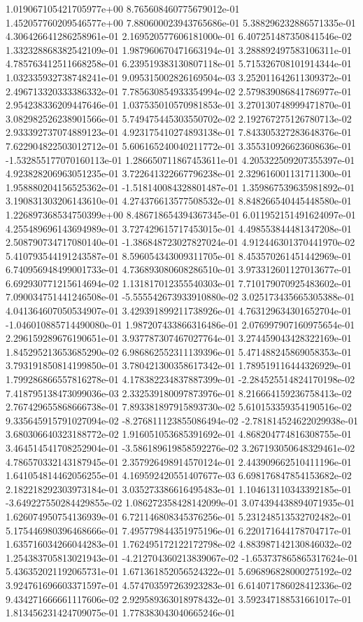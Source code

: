 1.019067105421705977e+00	8.765608460775679012e-01	1.452057760209546577e+00	7.880600023943765686e-01	5.388296232886571335e-01	4.306426641286258961e-01	2.169520577606181000e-01	6.407251487350841546e-02	1.332328868382542109e-01	1.987960670471663194e-01	3.288892497583106311e-01	4.785763412511668258e-01	6.239519383130807118e-01	5.715326708101914344e-01	1.032335932738748241e-01	9.095315002826169504e-03	3.252011642611309372e-01	2.496713320333386332e-01	7.785630854933354994e-02	2.579839086841786977e-01	2.954238336209447646e-01	1.037535010570981853e-01	3.270130748999471870e-01	3.082982526238901566e-01	5.749475445303550702e-02	2.192767275126780713e-02	2.933392737074889123e-01	4.923175410274893138e-01	7.843305327283648376e-01	7.622904822503012712e-01	5.606165240040211772e-01	3.355310926623608636e-01	-1.532855177070160113e-01	1.286650711867453611e-01	4.205322509207355397e-01	4.923828206963051235e-01	3.722641322667796238e-01	2.329616001131711300e-01	1.958880204156525362e-01	-1.518140084328801487e-01	1.359867539635981892e-01	3.190831303206143610e-01	4.274376613577508532e-01	8.848266540445448580e-01	1.226897368534750399e+00	8.486718654394367345e-01	6.011952151491624097e-01	4.255489696143694989e-01	3.727429615717453015e-01	4.498553844481347208e-01	2.508790734717080140e-01	-1.386848723027827024e-01	4.912446301370441970e-02	5.410793544191243587e-01	8.596054343009311705e-01	8.453570261451442969e-01	6.740956948499001733e-01	4.736893080608286510e-01	3.973312601127013677e-01	6.692930771215614694e-02	1.131817012355540303e-01	7.710179070925483602e-01	7.090034751441246508e-01	-5.555542673933910880e-02	3.025173435665305388e-01	4.041364607050534907e-01	3.429391899211738926e-01	4.763129634301652704e-01	-1.046010885714490080e-01	1.987207433866316486e-01	2.076997907160975654e-01	2.296159289676190651e-01	3.937787307467027764e-01	3.274459043428322169e-01	1.845295213653685290e-02	6.986862552311139396e-01	5.471488245869058353e-01	3.793191850814199850e-01	3.780421300358617342e-01	1.789519116444326929e-01	1.799286866557816278e-01	4.178382234837887399e-01	-2.284525514824170198e-02	7.418795138473099036e-03	2.332539180097873976e-01	8.216664159236758413e-02	2.767429655868666738e-01	7.893381897915893730e-02	5.610153359354190516e-02	9.335645915791027094e-02	-8.276811123855086494e-02	-2.781814524622029938e-01	3.680306640323188772e-02	1.916051053685391692e-01	4.868204774816308755e-01	3.464514541708252904e-01	-3.586189619858592276e-02	3.267193050648329461e-02	4.786570332143187945e-01	2.357926498914570124e-01	2.443909662510411196e-01	1.641054814462056255e-01	4.169592420551407677e-03	6.698176847854153682e-02	2.182218292303973184e-01	3.035273386616495483e-01	1.104613110343392185e-01	-3.649227550284429855e-02	1.086272358428142099e-01	3.074394438894071935e-01	1.626074950754136939e-01	6.721146808345376256e-01	5.231248513532702482e-01	5.175446980396468666e-01	7.495779844351975196e-01	6.220171644178704717e-01	1.635716034266044283e-01	1.762495172122172798e-02	4.883987142130846032e-02	1.254383705813021943e-01	-4.212704360213839067e-02	-1.653737865865317624e-01	5.436352021192065731e-01	1.671361852056524322e-01	5.696896828000275192e-02	3.924761696603371597e-01	4.574703597263923283e-01	6.614071786028412336e-02	9.434271666661117606e-02	2.929589363018978432e-01	3.592347188531661017e-01	1.813456231424709075e-01	1.778383043040665246e-01